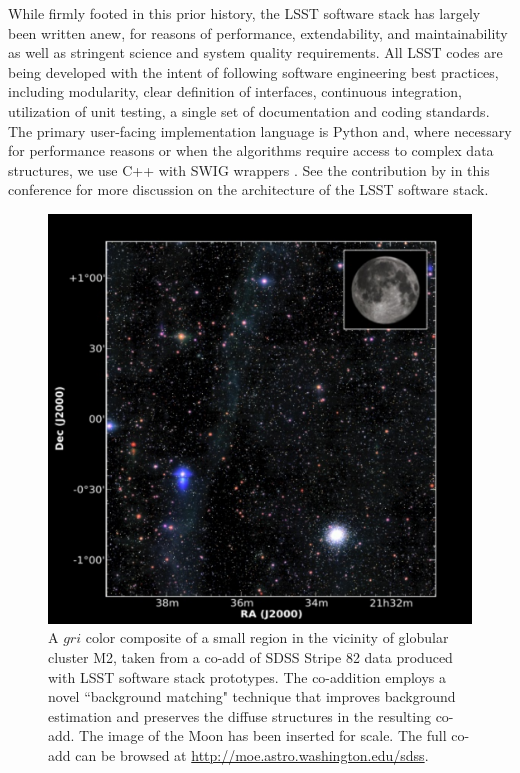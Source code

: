 \documentclass[11pt,twoside]{article}
\begin{document}
While firmly footed in this prior history, the LSST software stack has
largely been written anew, for reasons of performance, extendability, and
maintainability as well as stringent science and system quality requirements.
All LSST codes are being developed with the intent of
following software engineering best practices, including modularity, clear definition
of interfaces, continuous integration,
utilization of unit testing, a single set of documentation and coding
standards. The primary user-facing implementation language is Python and, where
necessary for performance reasons or when the algorithms require access to 
complex data structures, we use C++ with SWIG wrappers
\citep{Beazley:1996:SEU:1267498.1267513}.
See the contribution by \citet{P056_adassxxv} in this conference for
more discussion on the architecture of the LSST software stack.
\\

\begin{figure}[!t]
%
%
\includegraphics[width=1.0\hsize,clip]{DMStripe82.pdf}
\caption{
A $gri$ color composite of a small region in the vicinity of globular cluster M2, taken from a co-add of
SDSS Stripe 82 data produced with LSST software stack prototypes.  The
co-addition employs a novel ``background matching" technique
\citep{2014MNRAS.440.1296H} that improves
background estimation and preserves the diffuse structures in the resulting
co-add. The image of the Moon has been inserted for scale. The full
co-add can be browsed at \url{http://moe.astro.washington.edu/sdss}.}
\label{Fig:DMStripe82}
\end{figure}
\end{document}
